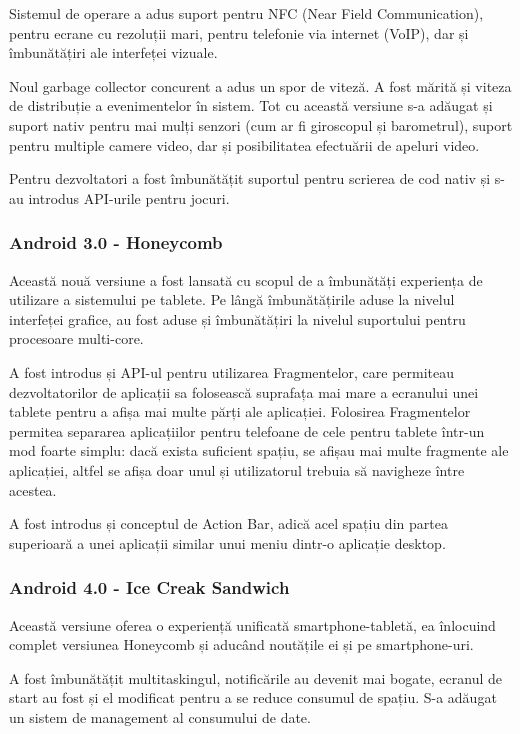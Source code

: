 \documentclass[12pt,a4paper]{article}
\begin{document}
	Sistemul de operare a adus suport pentru NFC (Near Field Communication), pentru ecrane cu rezoluții mari, pentru telefonie via internet (VoIP), dar și îmbunătățiri ale interfeței vizuale.

	Noul garbage collector concurent a adus un spor de viteză. A fost mărită și viteza de distribuție a evenimentelor în sistem. Tot cu această versiune s-a adăugat și suport nativ pentru mai mulți senzori (cum ar fi giroscopul și barometrul), suport pentru multiple camere video, dar și posibilitatea efectuării de apeluri video.

	Pentru dezvoltatori a fost îmbunătățit suportul pentru scrierea de cod nativ și s-au introdus API-urile pentru jocuri.


\subsubsection{Android 3.0 - Honeycomb}
Această nouă versiune a fost lansată cu scopul de a îmbunătăți experiența de utilizare a sistemului pe tablete. Pe lângă îmbunătățirile aduse la nivelul interfeței grafice, au fost aduse și îmbunătățiri la nivelul suportului pentru procesoare multi-core.

	A fost introdus și API-ul pentru utilizarea Fragmentelor, care permiteau dezvoltatorilor de aplicații sa folosească suprafața mai mare a ecranului unei tablete pentru a afișa mai multe părți ale aplicației. Folosirea Fragmentelor permitea separarea aplicațiilor pentru telefoane de cele pentru tablete într-un mod foarte simplu: dacă exista suficient spațiu, se afișau mai multe fragmente ale aplicației, altfel se afișa doar unul și utilizatorul trebuia să navigheze între acestea.

	A fost introdus și conceptul de Action Bar, adică acel spațiu din partea superioară a unei aplicații similar unui meniu dintr-o aplicație desktop.


\subsubsection{Android 4.0 - Ice Creak Sandwich}
Această versiune oferea o experiență unificată smartphone-tabletă, ea înlocuind complet versiunea Honeycomb și aducând noutățile ei și pe smartphone-uri.

	A fost îmbunătățit multitaskingul, notificările au devenit mai bogate, ecranul de start au fost și el modificat pentru a se reduce consumul de spațiu. S-a adăugat un sistem de management al consumului de date.
\end{document}
